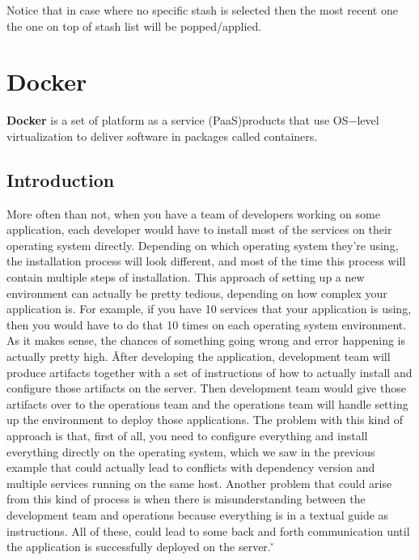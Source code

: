Notice that in case where no specific stash is selected then the most recent one the one on top of stash list will be
popped/applied.

\newpage

\section{Docker}


\bd[Docker]
\textbf{Docker} is a set of platform as a service (PaaS)\footnotemark products that use OS$-$level virtualization to
deliver software in packages called containers.
\ed


\subsection{Introduction}

More often than not, when you have a team of developers working on some application, each developer would have to
install most of the services on their operating system directly. Depending on which operating system they're using,
the installation process will look different, and most of the time this process will contain multiple steps of
installation. This approach of setting up a new environment can actually be pretty tedious, depending on how complex
your application is. For example, if you have 10 services that your application is using, then you would have to do
that 10 times on each operating system environment. As it makes sense, the chances of something going wrong and error
happening is actually pretty high. \v

After developing the application, development team will produce artifacts together with a set of instructions of how
to actually install and configure those artifacts on the server. Then development team would give those artifacts
over to the operations team and the operations team will handle setting up the environment to deploy those
applications. The problem with this kind of approach is that, first of all, you need to configure everything and
install everything directly on the operating system, which we saw in the previous example that could actually lead to
conflicts with dependency version and multiple services running on the same host. Another problem that could arise
from this kind of process is when there is misunderstanding between the development team and operations because
everything is in a textual guide as instructions. All of these, could lead to some back and forth communication until
the application is successfully deployed on the server. \v

